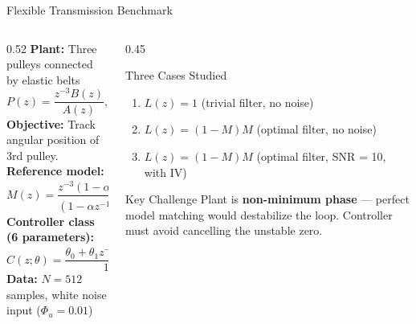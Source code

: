 \documentclass[aspectratio=169]{beamer}
\begin{document}
\begin{frame}{Flexible Transmission Benchmark}
  \begin{columns}[T]
    \begin{column}{0.52\textwidth}
      \textbf{Plant:} Three pulleys connected by elastic belts
      \[
        P(z) = \frac{z^{-3}B(z)}{A(z)}, \quad T_s = 0.05\,\text{s}
      \]
      \textbf{Objective:} Track angular position of 3rd pulley.\\[0.5em]
      \textbf{Reference model:}
      \[
        M(z) = \frac{z^{-3}(1-\alpha)^2}{(1-\alpha z^{-1})^2}, \quad \alpha = e^{-T_s \omega_0}
      \]
      \textbf{Controller class (6 parameters):}
      \[
        C(z;\theta) = \frac{\theta_0 + \theta_1 z^{-1}+\cdots+\theta_5 z^{-5}}{1-z^{-1}}
      \]
      \textbf{Data:} $N=512$ samples, white noise input ($\Phi_u=0.01$)
    \end{column}
    \begin{column}{0.45\textwidth}
      \begin{block}{Three Cases Studied}
        \begin{enumerate}
          \item $L(z)=1$ (trivial filter, no noise)
          \item $L(z) = (1-M)M$ (optimal filter, no noise)
          \item $L(z) = (1-M)M$ (optimal filter, SNR = 10, with IV)
        \end{enumerate}
      \end{block}
      \vspace{0.4em}
      \begin{alertblock}{Key Challenge}
        Plant is \textbf{non-minimum phase} --- perfect model matching would destabilize the loop. Controller must avoid cancelling the unstable zero.
      \end{alertblock}
    \end{column}
  \end{columns}
\end{frame}
\end{document}

